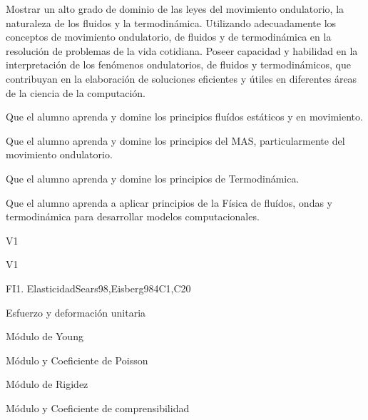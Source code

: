 \begin{syllabus}


\begin{justification}
Mostrar un alto grado de dominio de las leyes del movimiento ondulatorio, la naturaleza de los fluidos y la termodinámica. Utilizando adecuadamente los conceptos de movimiento ondulatorio, de fluidos y de termodinámica en la resolución de problemas de la vida cotidiana. Poseer capacidad y habilidad en la interpretación de los fenómenos ondulatorios, de fluidos y termodinámicos, que contribuyan en la elaboración de soluciones eficientes y útiles en diferentes áreas de la ciencia de la computación.
\end{justification}

\begin{goals}
\item  Que el alumno aprenda y domine los principios fluídos estáticos y en movimiento.
\item  Que el alumno aprenda y domine los principios del MAS, particularmente del movimiento ondulatorio.
\item  Que el alumno aprenda y domine los principios de Termodinámica.
\item  Que el alumno aprenda a aplicar principios de la Física de fluídos, ondas y termodinámica para desarrollar modelos computacionales.
\end{goals}

\begin{outcomes}{V1}
  \item {}
  \item {}
  \item {}
\end{outcomes}

\begin{competences}{V1}
    \item {}
    \item {}
\end{competences}

\begin{unit}{FI1. Elasticidad}{}{Sears98,Eisberg98}{4}{C1,C20}
\begin{topics}
         \item  Esfuerzo y deformación unitaria
	 \item  Módulo de Young
         \item  Módulo y Coeficiente de Poisson
	 \item  Módulo de Rigidez
         \item  Módulo y Coeficiente de comprensibilidad
   \end{topics}


\end{unit}
\end{syllabus}
